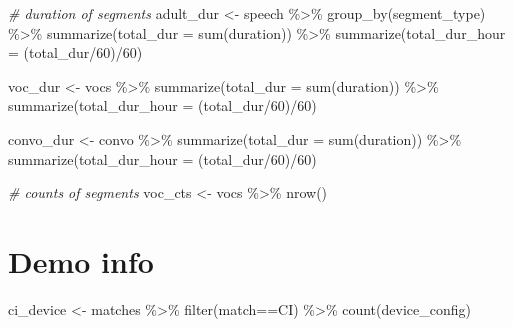 \documentclass[
]{article}
\newenvironment{Shaded}{\begin{snugshade}}{\end{snugshade}}
\newcommand{\AttributeTok}[1]{\textcolor[rgb]{0.77,0.63,0.00}{#1}}
\newcommand{\CommentTok}[1]{\textcolor[rgb]{0.56,0.35,0.01}{\textit{#1}}}
\newcommand{\DecValTok}[1]{\textcolor[rgb]{0.00,0.00,0.81}{#1}}
\newcommand{\FunctionTok}[1]{\textcolor[rgb]{0.00,0.00,0.00}{#1}}
\newcommand{\NormalTok}[1]{#1}
\newcommand{\OtherTok}[1]{\textcolor[rgb]{0.56,0.35,0.01}{#1}}
\newcommand{\SpecialCharTok}[1]{\textcolor[rgb]{0.00,0.00,0.00}{#1}}
\newcommand{\StringTok}[1]{\textcolor[rgb]{0.31,0.60,0.02}{#1}}
\begin{document}
\begin{Shaded}
\begin{Highlighting}[]
\CommentTok{\# duration of segments}
\NormalTok{adult\_dur }\OtherTok{\textless{}{-}}\NormalTok{ speech }\SpecialCharTok{\%\textgreater{}\%}
  \FunctionTok{group\_by}\NormalTok{(segment\_type) }\SpecialCharTok{\%\textgreater{}\%}
  \FunctionTok{summarize}\NormalTok{(}\AttributeTok{total\_dur =} \FunctionTok{sum}\NormalTok{(duration)) }\SpecialCharTok{\%\textgreater{}\%}
  \FunctionTok{summarize}\NormalTok{(}\AttributeTok{total\_dur\_hour =}\NormalTok{ (total\_dur}\SpecialCharTok{/}\DecValTok{60}\NormalTok{)}\SpecialCharTok{/}\DecValTok{60}\NormalTok{)}

\NormalTok{voc\_dur }\OtherTok{\textless{}{-}}\NormalTok{ vocs }\SpecialCharTok{\%\textgreater{}\%}
  \FunctionTok{summarize}\NormalTok{(}\AttributeTok{total\_dur =} \FunctionTok{sum}\NormalTok{(duration)) }\SpecialCharTok{\%\textgreater{}\%}
  \FunctionTok{summarize}\NormalTok{(}\AttributeTok{total\_dur\_hour =}\NormalTok{ (total\_dur}\SpecialCharTok{/}\DecValTok{60}\NormalTok{)}\SpecialCharTok{/}\DecValTok{60}\NormalTok{)}

\NormalTok{convo\_dur }\OtherTok{\textless{}{-}}\NormalTok{ convo }\SpecialCharTok{\%\textgreater{}\%}
  \FunctionTok{summarize}\NormalTok{(}\AttributeTok{total\_dur =} \FunctionTok{sum}\NormalTok{(duration)) }\SpecialCharTok{\%\textgreater{}\%}
  \FunctionTok{summarize}\NormalTok{(}\AttributeTok{total\_dur\_hour =}\NormalTok{ (total\_dur}\SpecialCharTok{/}\DecValTok{60}\NormalTok{)}\SpecialCharTok{/}\DecValTok{60}\NormalTok{)}

\CommentTok{\# counts of segments}
\NormalTok{voc\_cts }\OtherTok{\textless{}{-}}\NormalTok{ vocs }\SpecialCharTok{\%\textgreater{}\%}
  \FunctionTok{nrow}\NormalTok{()}
\end{Highlighting}
\end{Shaded}

\hypertarget{demo-info}{%
\section{Demo info}\label{demo-info}}

\begin{Shaded}
\begin{Highlighting}[]
\NormalTok{ci\_device }\OtherTok{\textless{}{-}}\NormalTok{ matches }\SpecialCharTok{\%\textgreater{}\%}
  \FunctionTok{filter}\NormalTok{(match}\SpecialCharTok{==}\StringTok{\textquotesingle{}CI\textquotesingle{}}\NormalTok{) }\SpecialCharTok{\%\textgreater{}\%}
  \FunctionTok{count}\NormalTok{(device\_config)}
\end{Highlighting}
\end{Shaded}
\end{document}
